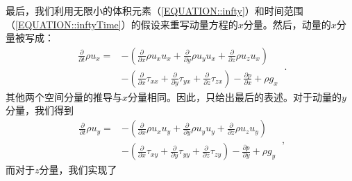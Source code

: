 \documentclass[LBMDerivation.tex]{subfiles}
\begin{document}
%
%
	最后，我们利用无限小的体积元素（\ref{EQUATION::infty}）和时间范围（\ref{EQUATION::inftyTime}）的假设来重写动量方程的$x$分量。然后，动量的$x$分量被写成：
%
%
\begin{equation}\boxed{\begin{aligned}
  \frac{\partial}{\partial t} \rho u_x
=
 &-\left(
      \frac{\partial}{\partial x} \rho u_x u_x
      +\frac{\partial}{\partial y} \rho u_y u_x
      +\frac{\partial}{\partial z} \rho u_z u_x
  \right)\\
 &-\left(
      \frac{\partial}{\partial x}  \tau_{xx}
      +\frac{\partial}{\partial y}  \tau_{yx}
      +\frac{\partial}{\partial z}  \tau_{zx}
  \right)
  -
  \frac{\partial p}{\partial x}
  +
  \rho g_x
  \label{EQUATION::momentumX}
\end{aligned}} ~.\end{equation}
%
%
    其他两个空间分量的推导与$x$分量相同。因此，只给出最后的表述。对于动量的$y$分量，我们得到
%
%
\begin{equation}\boxed{\begin{aligned}
  \frac{\partial}{\partial t} \rho u_y
=
 &-\left(
      \frac{\partial}{\partial x} \rho u_x u_y
      +\frac{\partial}{\partial y} \rho u_y u_y
      +\frac{\partial}{\partial z} \rho u_z u_y
  \right)\\
 &-\left(
      \frac{\partial}{\partial x}  \tau_{xy}
      +\frac{\partial}{\partial y}  \tau_{yy}
      +\frac{\partial}{\partial z}  \tau_{zy}
  \right)
  -
  \frac{\partial p}{\partial y}
  +
  \rho g_y
  \label{EQUATION::momentumY}
\end{aligned}}~,
\end{equation}
%
%
	而对于$z$分量，我们实现了
%
%
\end{document}
